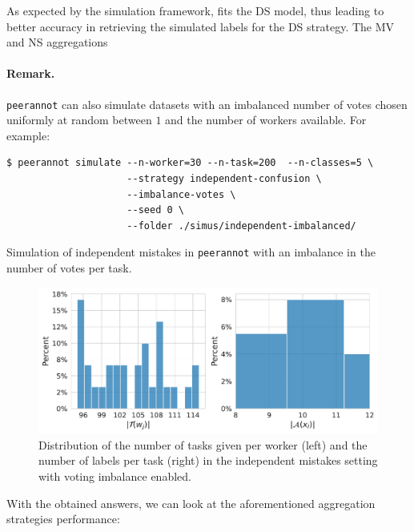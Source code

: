 As expected by the simulation framework,  fits the DS model, thus leading to better accuracy in retrieving the simulated labels for the DS strategy. The MV and NS aggregations

\paragraph*{Remark.} \texttt{peerannot} can also simulate datasets with an imbalanced number of votes chosen uniformly at random between $1$ and the number of workers available. For example:

\begin{listing}[H]
    \begin{verbatim}
$ peerannot simulate --n-worker=30 --n-task=200  --n-classes=5 \
                     --strategy independent-confusion \
                     --imbalance-votes \
                     --seed 0 \
                     --folder ./simus/independent-imbalanced/
    \end{verbatim}
    \caption{Simulation of independent mistakes in \texttt{peerannot} with an imbalance in the number of votes per task.}
    \label{lst:indep_mistakes_simu_imb}
\end{listing}

\begin{figure}[tbh]
    \centering
    \includegraphics[width=\textwidth]{./images_peerannot/fig-simu2-output-1.pdf}
    \caption{Distribution of the number of tasks given per worker (left) and the number of labels per task (right) in the independent mistakes setting with voting imbalance enabled.}
    \label{fig:desc_independent_imbalance}
\end{figure}

With the obtained answers, we can look at the aforementioned aggregation strategies performance:

